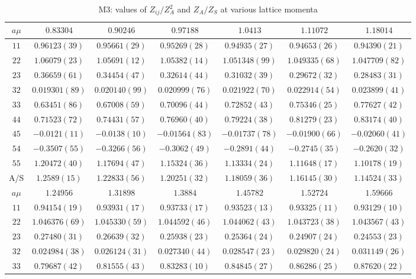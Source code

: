 \begin{table}
\begin{center}
\caption{M3: values of $Z_{ij}/Z_A^2$ and $Z_A/Z_S$ at various lattice momenta}
\begin{tabular}{c|c c c c c c}
\hline
\hline
$a\mu$ & $0.83304$ & $0.90246$ & $0.97188$ & $1.0413$ & $1.11072$ & $1.18014$ \\
\hline
$11$ & $0.96123(39)$ & $0.95661(29)$ & $0.95269(28)$ & $0.94935(27)$ & $0.94653(26)$ & $0.94390(21)$ \\
$22$ & $1.06079(23)$ & $1.05691(12)$ & $1.05382(14)$ & $1.051348(99)$ & $1.049335(68)$ & $1.047709(82)$ \\
$23$ & $0.36659(61)$ & $0.34454(47)$ & $0.32614(44)$ & $0.31032(39)$ & $0.29672(32)$ & $0.28483(31)$ \\
$32$ & $0.019301(89)$ & $0.020140(99)$ & $0.020999(76)$ & $0.021922(70)$ & $0.022914(54)$ & $0.023899(41)$ \\
$33$ & $0.63451(86)$ & $0.67008(59)$ & $0.70096(44)$ & $0.72852(43)$ & $0.75346(25)$ & $0.77627(42)$ \\
$44$ & $0.71523(72)$ & $0.74431(57)$ & $0.76960(40)$ & $0.79224(38)$ & $0.81279(23)$ & $0.83174(40)$ \\
$45$ & $-0.0121(11)$ & $-0.0138(10)$ & $-0.01564(83)$ & $-0.01737(78)$ & $-0.01900(66)$ & $-0.02060(41)$ \\
$54$ & $-0.3507(55)$ & $-0.3266(56)$ & $-0.3062(49)$ & $-0.2891(44)$ & $-0.2745(35)$ & $-0.2620(32)$ \\
$55$ & $1.20472(40)$ & $1.17694(47)$ & $1.15324(36)$ & $1.13334(24)$ & $1.11648(17)$ & $1.10178(19)$ \\
\hline
A/S & $1.2589(15)$ & $1.22833(56)$ & $1.20251(32)$ & $1.18059(36)$ & $1.16145(30)$ & $1.14524(33)$ \\
\hline
$a\mu$ & $1.24956$ & $1.31898$ & $1.3884$ & $1.45782$ & $1.52724$ & $1.59666$ \\
\hline
$11$ & $0.94154(19)$ & $0.93931(17)$ & $0.93733(17)$ & $0.93523(13)$ & $0.93325(11)$ & $0.93129(10)$ \\
$22$ & $1.046376(69)$ & $1.045330(59)$ & $1.044592(46)$ & $1.044062(43)$ & $1.043723(38)$ & $1.043567(43)$ \\
$23$ & $0.27480(31)$ & $0.26639(32)$ & $0.25938(23)$ & $0.25364(24)$ & $0.24907(24)$ & $0.24553(23)$ \\
$32$ & $0.024984(38)$ & $0.026124(31)$ & $0.027340(44)$ & $0.028547(23)$ & $0.029820(24)$ & $0.031149(26)$ \\
$33$ & $0.79687(42)$ & $0.81555(43)$ & $0.83283(10)$ & $0.84845(27)$ & $0.86286(25)$ & $0.87620(22)$ \\

\end{tabular}
\end{center}
\end{table}
